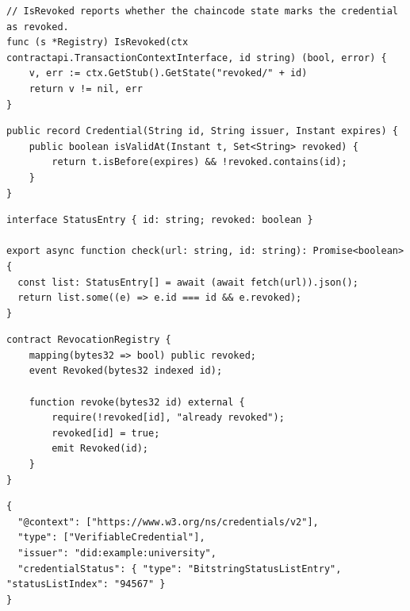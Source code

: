 \begin{listing}[!ht]
\begin{verbatim}
// IsRevoked reports whether the chaincode state marks the credential as revoked.
func (s *Registry) IsRevoked(ctx contractapi.TransactionContextInterface, id string) (bool, error) {
	v, err := ctx.GetStub().GetState("revoked/" + id)
	return v != nil, err
}
\end{verbatim}
\caption{Go (a Hyperledger Fabric chaincode function).}\label{lst:latex:go}
\end{listing}

\begin{listing}[!ht]
\begin{verbatim}
public record Credential(String id, String issuer, Instant expires) {
    public boolean isValidAt(Instant t, Set<String> revoked) {
        return t.isBefore(expires) && !revoked.contains(id);
    }
}
\end{verbatim}
\caption{Java.}\label{lst:latex:java}
\end{listing}

\begin{listing}[!ht]
\begin{verbatim}
interface StatusEntry { id: string; revoked: boolean }

export async function check(url: string, id: string): Promise<boolean> {
  const list: StatusEntry[] = await (await fetch(url)).json();
  return list.some((e) => e.id === id && e.revoked);
}
\end{verbatim}
\caption{TypeScript.}\label{lst:latex:ts}
\end{listing}

\begin{listing}[!ht]
\begin{verbatim}
contract RevocationRegistry {
    mapping(bytes32 => bool) public revoked;
    event Revoked(bytes32 indexed id);

    function revoke(bytes32 id) external {
        require(!revoked[id], "already revoked");
        revoked[id] = true;
        emit Revoked(id);
    }
}
\end{verbatim}
\caption{Solidity.}\label{lst:latex:solidity}
\end{listing}

\FloatBarrier
\begin{listing}[!ht]
\begin{verbatim}
{
  "@context": ["https://www.w3.org/ns/credentials/v2"],
  "type": ["VerifiableCredential"],
  "issuer": "did:example:university",
  "credentialStatus": { "type": "BitstringStatusListEntry", "statusListIndex": "94567" }
}
\end{verbatim}
\caption{JSON (a verifiable credential).}\label{lst:latex:json}
\end{listing}

